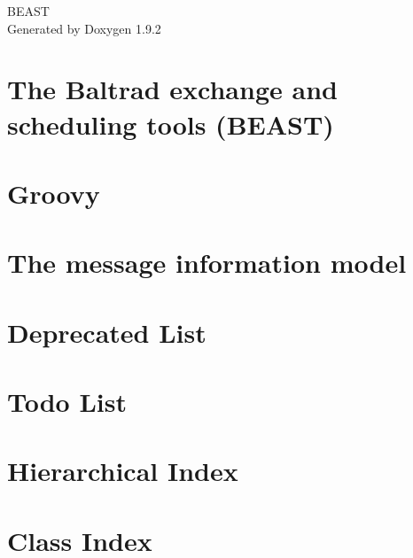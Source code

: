 \documentclass[twoside]{book}
\newcommand{\+}{\discretionary{\mbox{\scriptsize$\hookleftarrow$}}{}{}}
\newcommand{\clearemptydoublepage}{%
    \newpage{\pagestyle{empty}\cleardoublepage}%
  }
\begin{document}
  \raggedbottom
    \hypersetup{pageanchor=false,
                bookmarksnumbered=true,
                pdfencoding=unicode
               }
  \begin{titlepage}
  \vspace*{7cm}
  \begin{center}%
  {\Large BEAST}\\
  \vspace*{1cm}
  {\large Generated by Doxygen 1.9.2}\\
  \end{center}
  \end{titlepage}
  \clearemptydoublepage
  \tableofcontents
  \clearemptydoublepage
  \hypersetup{pageanchor=true}
\chapter{The Baltrad exchange and scheduling tools (BEAST)}
\label{index}\hypertarget{index}{}
\chapter{Groovy}
\label{p_groovyrules}

\chapter{The message information model}
\label{p_message_ib}

\chapter{Deprecated List}
\label{deprecated}

\chapter{Todo List}
\label{todo}

\chapter{Hierarchical Index}

\chapter{Class Index}

\end{document}
